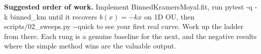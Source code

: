 \documentclass[11pt,a4paper]{article}
\newcommand{\code}[1]{{\ttfamily\small #1}}
\begin{document}
\vspace{1.2em}
\begin{keybox}
\textbf{Suggested order of work.} Implement \code{BinnedKramersMoyal.fit}, run
\code{pytest -q -k binned\_km} until it recovers $b(x)=-kx$ on 1D OU, then
\code{scripts/02\_sweeps.py {-}{-}quick} to see your first real curve. Work up the ladder
from there. Each rung is a genuine baseline for the next, and the negative results
\textemdash{} where the simple method wins \textemdash{} are the valuable output.
\end{keybox}
\end{document}
